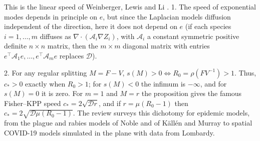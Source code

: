 \label{r:splitDir}
This is the linear speed of Weinberger, Lewis and Li \cite{WeinbergerLewisLi2002}. 1. The speed of exponential modes depends in principle on $e$, but since the Laplacian
models diffusion independent of the direction, here it does not depend on $e$ (if each species $i=1,\ldots,m$ diffuses as $\nabla\cdot(\mathcal A_i\nabla Z_i)$, with $\mathcal A_i$ a constant symmetric positive definite $n\times n$ matrix, then the $m\times m$ diagonal matrix with entries $e^\top\mathcal A_1e,\ldots,e^\top\mathcal A_me$ replaces $\mathcal D$).

2. For any regular splitting $M=F-V$, $s(M)>0\iff R_0=\rho(FV^{-1})>1$.
Thus, $c_*>0$ exactly when $R_0>1$; for $s(M)<0$ the infimum is $-\infty$, and for $s(M)=0$ it is zero. For $m=1$ and $M=r$ the proposition gives the famous Fisher--KPP speed $c_*=2\sqrt{\mathcal Dr}$,
and if $r=\mu(R_0-1)$ then $c_*=2\sqrt{\mathcal D\mu(R_0-1)}$. The review \cite{DavydovychDutkaCherniha2023} surveys this dichotomy for epidemic models, from the plague and rabies models of Noble and of K\"all\'en and Murray to spatial COVID-19 models simulated in the plane with data from Lombardy.


\eeR

